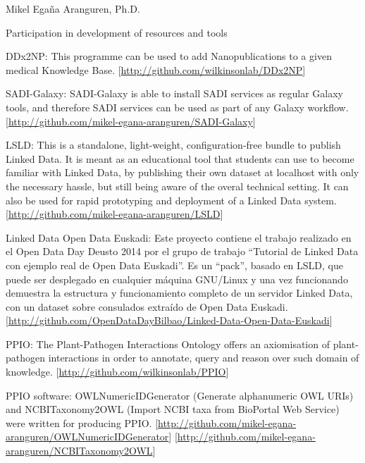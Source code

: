 \documentclass[english,11pt,a4paper,oneside]{article}
\begin{document}
\begin{cv}{Mikel Ega\~na Aranguren, Ph.D. }
\begin{cvlist}{Participation in development of resources and tools}
	\item [DDx2NP:] This programme can be used to add Nanopublications to a given medical Knowledge Base. [\href{http://github.com/wilkinsonlab/DDx2NP}{http://github.com/wilkinsonlab/DDx2NP}]

	\item [SADI-Galaxy:] SADI-Galaxy is able to install SADI services as regular Galaxy tools, and therefore SADI services can be used as part of any Galaxy workflow. [\href{http://github.com/mikel-egana-aranguren/SADI-Galaxy}{http://github.com/mikel-egana-aranguren/SADI-Galaxy}]

	\item [LSLD:] This is a standalone, light-weight, configuration-free bundle to publish Linked Data. It is meant as an educational tool that students can use to become familiar with Linked Data, by publishing their own dataset at localhost with only the necessary hassle, but still being aware of the overal technical setting. It can also be used for rapid prototyping and deployment of a Linked Data system. [\href{http://github.com/mikel-egana-aranguren/LSLD}{http://github.com/mikel-egana-aranguren/LSLD}]
	
	\item [Linked Data Open Data Euskadi:] Este proyecto contiene el trabajo realizado en el Open Data Day Deusto 2014 por el grupo de trabajo ``Tutorial de Linked Data con ejemplo real de Open Data Euskadi''. Es un ``pack'', basado en LSLD, que puede ser desplegado en cualquier m\'aquina GNU/Linux y una vez funcionando demuestra la estructura y funcionamiento completo de un servidor Linked Data, con un dataset sobre consulados extra\'ido de Open Data Euskadi. [\href{http://github.com/OpenDataDayBilbao/Linked-Data-Open-Data-Euskadi}{http://github.com/OpenDataDayBilbao/Linked-Data-Open-Data-Euskadi}]

	\item [PPIO:] The Plant-Pathogen Interactions Ontology offers an axiomisation of plant-pathogen interactions in order to annotate, query and reason over such domain of knowledge. [\href{http://github.com/wilkinsonlab/PPIO}{http://github.com/wilkinsonlab/PPIO}]
	
	\item [PPIO software:] OWLNumericIDGenerator (Generate alphanumeric OWL URIs) and NCBITaxonomy2OWL (Import NCBI taxa from BioPortal Web Service) were written for producing PPIO. [\href{http://github.com/mikel-egana-aranguren/OWLNumericIDGenerator}{http://github.com/mikel-egana-aranguren/OWLNumericIDGenerator}] [\href{http://github.com/mikel-egana-aranguren/NCBITaxonomy2OWL}{http://github.com/mikel-egana-aranguren/NCBITaxonomy2OWL}]


\end{cvlist}
\end{cv}
\end{document}
